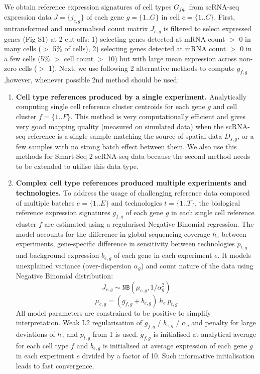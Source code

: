 \documentclass[11pt,a4paper]{article}
\begin{document}
We obtain reference expression signatures of cell types $G_{fg,}$ from scRNA-seq  expression data $J=\{j_{c,g}\}$ of each gene $g=\{1..G\}$ in cell $c=\{1..C\}$. First, untransformed and unnormalised count matrix $J_{c,g}$ is filtered to select expressed genes (Fig S1) at 2 cut-offs: 1) selecting genes detected at mRNA count $>$ 0 in many cells ($>$ 5\% of cells), 2) selecting genes detected at mRNA count $>$ 0 in a few cells (5\% $>$ cell count $>$ 10) but with large mean expression across non-zero cells ($>$ 1). Next, we use following 2 alternative methods to compute $g_{f,g}$,however, whenever possible 2nd method should be used:
\begin{enumerate}
    \item \textbf{Cell type references produced by a single experiment.} Analytically computing single cell reference cluster centroids for each gene $g$ and cell cluster $f=\{1..F\}$. This method is very computationally efficient and gives very good mapping quality (measured on simulated data) when the scRNA-seq reference is a single sample matching the source of spatial data $D_{s,g}$, or a few samples with no strong batch effect between them. We also use this methods for Smart-Seq 2 scRNA-seq data because the second method needs to be extended to utilise this data type.
    \item \textbf{Complex cell type references produced multiple experiments and technologies.} To address the usage of challenging reference data composed of multiple batches $e=\{1..E\}$ and technologies $t=\{1..T\}$, the biological reference expression signatures $g_{f,g}$ of each gene $g$ in each single cell reference cluster $f$ are estimated using a regularised Negative Binomial regression. The model accounts for the difference in global sequencing coverage $h_e$ between experiments, gene-specific difference in sensitivity between technologies $p_{t,g}$ and background expression $b_{e,g}$ of each gene in each experiment $e$. It models unexplained variance (over-dispersion $\alpha_g$) and count nature of the data using Negative Binomial distribution:
    \begin{equation} \label{eq:c2l_ref_prog:1}
    J_{c,g} \sim \mathtt{NB}(\mu_{c,g}, 1 / \alpha_g^2)
    \end{equation}
    \begin{equation} \label{eq:c2l_ref_prog:2}
    \mu_{c,g} = (g_{f,g} + b_{e,g}) \: {h_e} \: p_{t,g}
    \end{equation}
    All model parameters are constrained to be positive to simplify interpretation. Weak L2 regularisation of $g_{f,g}$ / $b_{e,g}$ / $\alpha_g$ and penalty for large deviations of $h_e$ and $p_{t,g}$ from 1 is used. $g_{f,g}$ is initialised at analytical average for each cell type $f$ and $b_{e,g}$ is initialised at average expression of each gene $g$ in each experiment $e$ divided by a factor of 10. Such informative initialisation leads to fast convergence.  \newline

\end{enumerate}
\end{document}
